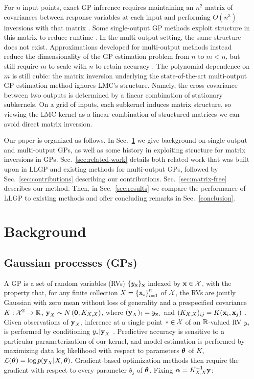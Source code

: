 \documentclass[twoside]{article}
\begin{document}
For $n$ input points, exact GP inference requires maintaining an $n^2$  matrix of covariances between response variables at each input and performing $O(n^3)$ inversions with that matrix \citep{williams1996gaussian}. Some single-output GP methods exploit structure in this matrix to reduce runtime \citep{msgp}. In the multi-output setting, the same structure does not exist. Approximations developed for multi-output methods instead reduce the dimensionality of the GP estimation problem from $n$ to $m<n$, but still require $m$ to scale with $n$ to retain accuracy \citep{nguyen2014collaborative}. The polynomial dependence on $m$ is still cubic: the matrix inversion underlying the state-of-the-art multi-output GP estimation method ignores LMC's structure. Namely, the cross-covariance between two outputs is determined by a linear combination of stationary subkernels. On a grid of inputs, each subkernel induces matrix structure, so viewing the LMC kernel as a linear combination of structured matrices we can avoid direct matrix inversion.

Our paper is organized as follows. In Sec.~\ref{sec:background} we give background on single-output and multi-output GPs, as well as some history in exploiting structure for matrix inversions in GPs. Sec.~\ref{sec:related-work} details both related work that was built upon in LLGP and existing methods for multi-output GPs, followed by Sec.~\ref{sec:contributions} describing our contributions. Sec.~\ref{sec:matrix-free} describes our method. Then, in Sec.~\ref{sec:results} we compare the performance of LLGP to existing methods and offer concluding remarks in Sec.~\ref{conclusion}.

\section{Background}
\label{sec:background}

\subsection{Gaussian processes (GPs)}

A GP is a set of random variables (RVs) $\{y_{\textbf{x}}\}_{\textbf{x}}$ indexed by $\textbf{x}\in\mathcal{X}$, with the property that, for any finite collection $X=\left\{ \textbf{x}_i \right\}_{ i=1 }^{ n }$ of $\mathcal{X}$, the RVs are jointly Gaussian with zero mean without loss of generality and a prespecified covariance $K:\mathcal{X}^2\rightarrow\mathbb{R}$, $\textbf{y}_X\sim N\left({\textbf{0}, K_{X, X}}\right)$, where $(\textbf{y}_X)_i=y_{\textbf{x}_i}$ and $(K_{X,X})_{ij}=K(\textbf{x}_i,\textbf{x}_j)$ \citep{williams1996gaussian}. Given observations of $\textbf{y}_X$, inference at a single point $*\in\mathcal{X}$ of an $\mathbb{R}$-valued RV $y_*$ is performed by conditioning $y_*|\textbf{y}_X$ \citep{williams1996gaussian}.
Predictive accuracy is sensitive to a particular parameterization of our kernel, and model estimation is performed by maximizing data log likelihood with respect to parameters ${\boldsymbol\theta}$ of $K$, $\mathcal{L}({\boldsymbol\theta})=\log p(\textbf{y}_{X}|X,{\boldsymbol\theta})$. Gradient-based optimization methods then require the gradient with respect to every parameter $\theta_j$ of ${\boldsymbol\theta}$. Fixing ${\boldsymbol\alpha}=K_{X,X}^{-1}\textbf{y}$:
\end{document}
